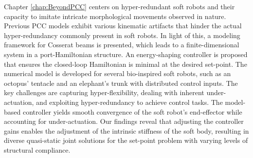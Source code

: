 Chapter \ref{chap:BeyondPCC} centers on hyper-redundant soft robots and their capacity to imitate intricate morphological movements observed in nature. Previous PCC models exhibit various kinematic artifacts that hinder the actual hyper-redundancy commonly present in soft robots. In light of this, a modeling framework for Cosserat beams is presented, which leads to a finite-dimensional system in a port-Hamiltonian structure. An energy-shaping controller is proposed that ensures the closed-loop Hamiltonian is minimal at the desired set-point. The numerical model is developed for several bio-inspired soft robots, such as an octopus' tentacle and an elephant's trunk with distributed control inputs. The key challenges are capturing hyper-flexibility, dealing with inherent under-actuation, and exploiting hyper-redundancy to achieve control tasks. The model-based controller yields smooth convergence of the soft robot's end-effector while accounting for under-actuation. Our findings reveal that adjusting the controller gains enables the adjustment of the intrinsic stiffness of the soft body, resulting in diverse quasi-static joint solutions for the set-point problem with varying levels of structural compliance. 

